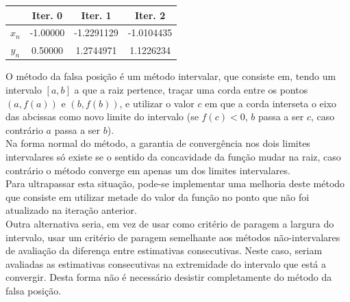 
\begin{center} \begin{tabular}{c | c c c}
	& Iter. 0 & Iter. 1 & Iter. 2\\ \hline
	$x_n$ & -1.00000 & -1.2291129 & -1.0104435 \\
	$y_n$ & 0.50000 & 1.2744971 & 1.1226234
\end{tabular} \end{center}
O método da falsa posição é um método intervalar, que consiste em, tendo um intervalo $[a,b]$ a que a raiz pertence, traçar uma corda entre os pontos $(a, f(a))$ e $(b, f(b))$, e utilizar o valor $c$ em que a corda interseta o eixo das abcissas como novo limite do intervalo (se $f(c) < 0$, $b$ passa a ser $c$, caso contrário $a$ passa a ser $b$).\\
Na forma normal do método, a garantia de convergência nos dois limites intervalares só existe se o sentido da concavidade da função mudar na raiz, caso contrário o método converge em apenas um dos limites intervalares.\\
Para ultrapassar esta situação, pode-se implementar uma melhoria deste método que consiste em utilizar metade do valor da função no ponto que não foi atualizado na iteração anterior.\\
Outra alternativa seria, em vez de usar como critério de paragem a largura do intervalo, usar um critério de paragem semelhante aos métodos não-intervalares de avaliação da diferença entre estimativas consecutivas. Neste caso, seriam avaliadas as estimativas consecutivas na extremidade do intervalo que está a convergir. Desta forma não é necessário desistir completamente do método da falsa posição.
